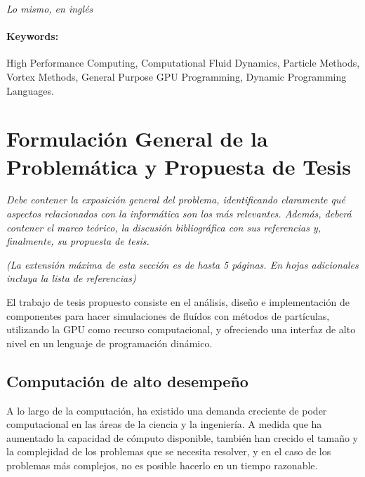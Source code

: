 \documentclass[11pt,spanish]{article}
\begin{document}
\emph{Lo mismo, en inglés}

\paragraph{Keywords:}
High Performance Computing,
Computational Fluid Dynamics,
Particle Methods,
Vortex Methods,
General Purpose GPU Programming,
Dynamic Programming Languages.

\newpage
\section{Formulación General de la Problemática y Propuesta de Tesis}

\emph{Debe contener la exposición general del problema, identificando claramente qué
aspectos relacionados con la informática son los más relevantes.  Además,
deberá contener el marco teórico, la discusión bibliográfica con sus
referencias y, finalmente, su propuesta de tesis.}
    
\emph{(La extensión máxima de esta sección es de hasta 5 páginas.  En hojas
adicionales incluya la lista de referencias)}

El trabajo de tesis propuesto consiste en el análisis, diseño e implementación
de componentes para hacer simulaciones de fluídos con métodos de partículas,
utilizando la GPU como recurso computacional, y ofreciendo una interfaz de alto
nivel en un lenguaje de programación dinámico.

\subsection{Computación de alto desempeño}

A lo largo de la computación, ha existido una demanda creciente de poder
computacional en las áreas de la ciencia y la ingeniería.  A medida que ha
aumentado la capacidad de cómputo disponible, también han crecido el tamaño y la
complejidad de los problemas que se necesita resolver, y en el caso de los
problemas más complejos, no es posible hacerlo en un tiempo razonable.
\cite{parallel-programming}
\end{document}
